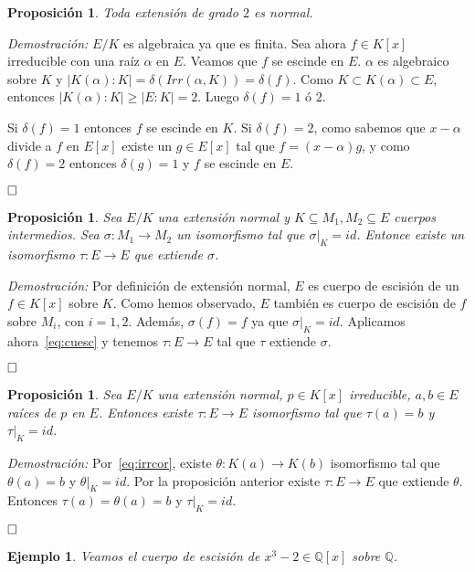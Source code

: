 \documentclass[12pt]{article}
\newtheorem{proposition}[theorem]{Proposición}
\newtheorem{example}{Ejemplo}[theorem]
\begin{document}
\begin{proposition} Toda extensión de grado $2$ es normal.
\end{proposition}
\emph{Demostración: }$E/K$ es algebraica ya que es finita. Sea ahora $f \in K[x]$ irreducible con una raíz $\alpha$ en $E$. Veamos que $f$ se escinde en $E$. $\alpha$ es algebraico sobre $K$ y $|K(\alpha) :K| = \delta(Irr(\alpha, K)) = \delta(f)$. Como $K \subset K(\alpha) \subset E$, entonces $|K(\alpha):K| \geq |E:K| = 2$. Luego $\delta(f) = 1$ ó $2$.

Si $\delta(f) = 1$ entonces $f$ se escinde en $K$. Si $\delta(f) = 2$, como sabemos que $x -\alpha$ divide a $f$ en $E[x]$ existe un $g \in E[x]$ tal que $f=(x-\alpha)g$, y como $\delta(f) = 2$ entonces $\delta(g) = 1$ y $f$ se escinde en $E$.

$\hfill \square$


\begin{proposition} \label{eq:extcint} Sea $E/K$ una extensión normal y $K \subseteq M_{1}, M_{2} \subseteq E$ cuerpos intermedios. Sea $\sigma \colon M_{1} \longrightarrow M_{2}$ un isomorfismo tal que $\left.\sigma \right|_K  = id$. Entonce existe un isomorfismo $\tau \colon E \longrightarrow E$ que extiende $\sigma$.
\end{proposition}
\emph{Demostración: } Por definición de extensión normal, $E$ es cuerpo de escisión de un $f \in K[x]$ sobre $K$. Como hemos observado, $E$ también es cuerpo de escisión de $f$ sobre $M_{i}$, con $i = 1,2$. Además, $\sigma (f) = f$ ya que $\left.\sigma \right|_K  = id$. Aplicamos ahora~\ref{eq:cuesc} y tenemos $\tau \colon E \longrightarrow E$ tal que $\tau$ extiende $\sigma$.

$\hfill \square$

\begin{proposition}\label{eq:isoimp} Sea $E/K$ una extensión normal, $p \in K[x]$ irreducible, $a, b \in E$ raíces de $p$ en $E$. Entonces existe $\tau \colon E \longrightarrow E$ isomorfismo tal que $\tau (a) = b$ y $\left.\tau \right|_K  = id$.
\end{proposition}
\emph{Demostración: } Por~\ref{eq:irrcor}, existe $\theta \colon K(a) \longrightarrow K(b)$ isomorfismo tal que $\theta (a) = b$ y $\left.\theta \right|_K  = id$. Por la proposición anterior existe $\tau \colon E \longrightarrow E$ que extiende $\theta$. Entonces $\tau (a) = \theta(a) = b$ y $\left.\tau \right|_K  = id$.

$\hfill \square$

\begin{example}Veamos el cuerpo de escisión de $x^{3}-2 \in \mathbb{Q}[x]$ sobre $\mathbb{Q}$.
\end{example}
\end{document}
